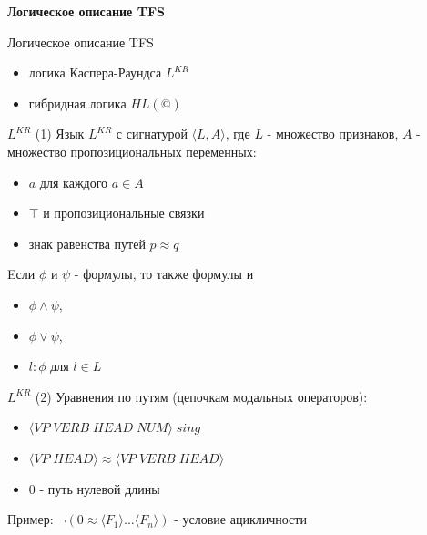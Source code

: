 \documentclass{beamer}
\begin{document}
\begin{frame}{}
\begin{center}
	\textbf{Логическое описание TFS}
\end{center}
\end{frame}

\begin{frame}{Логическое описание TFS}
\begin{itemize}
	\item логика Каспера-Раундса $L^{KR}$
	\item гибридная логика $HL(@)$
\end{itemize}
\end{frame}

\begin{frame}{$L^{KR}$ (1)}
Язык $L^{KR}$ с сигнатурой $\langle L, A \rangle$, где $L$ - множество признаков, $A$ - множество пропозициональных переменных:\\
\bigskip
\begin{itemize}
	\item $a$ для каждого $a \in A$
	\item $\top$ и пропозициональные связки
	\item знак равенства путей $p \approx q$
\end{itemize}
\bigskip	
Eсли $\phi$ и $\psi$ - формулы, то также формулы и 
\begin{itemize}
	\item $\phi \wedge \psi$,
	\item $\phi \vee \psi$,
	\item $l : \phi$ для $l \in L$
\end{itemize}
\end{frame}

\begin{frame}{$L^{KR}$ (2)}
Уравнения по путям (цепочкам модальных операторов):\\
\bigskip
\begin{itemize}
	\item $\langle VP \; VERB \; HEAD \; NUM \rangle \; sing$
	\item $\langle VP \; HEAD \rangle \approx \langle VP \; VERB \; HEAD \rangle$
	\item $0$ - путь нулевой длины
\end{itemize}
\bigskip
Пример: $\neg(0 \approx \langle F_1 \rangle ... \langle F_n \rangle)$ - условие ацикличности
\end{frame}
\end{document}
